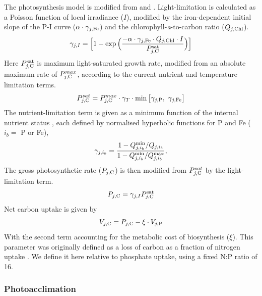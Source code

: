 \documentclass[gmd, manuscript]{copernicus}
\begin{document}
The photosynthesis model is modified from \cite{Geider:1998} and \cite{Moore:2002}. Light-limitation is calculated as a Poisson function of local irradiance ($I$), modified by the iron-dependent initial slope of the P-I curve ($\alpha \cdot \gamma_{j,{\rm Fe}}$) and the chlorophyll-\textit{a}-to-carbon ratio ($Q_{j,{\rm Chl}}$). 
%
\begin{equation}
\label{gammaI}
\gamma_{j,I} = \Big[ 1- \exp \Big( \frac{-\alpha \cdot \gamma_{j,{\rm Fe}} \cdot Q_{j,{\rm Chl}} \cdot { I}}{ P_{j,{\rm C}}^{\rm sat}} \Big) \Big]
\end{equation}
%
Here $P_{j,{\rm C}}^{\rm sat}$ is maximum light-saturated growth rate, modified from an absolute maximum rate of $P_{j,{\rm C}}^{max}$, according to the current nutrient and temperature limitation terms.
%
\begin{equation}
P_{j,{\rm C}}^{sat} = P_{j,{\rm C}}^{max} \cdot \gamma_T \cdot \min \big[ \gamma_{j,{\rm P}},~\gamma_{j,{\rm Fe}} \big]
\end{equation}
%
The nutrient-limitation term is given as a minimum function of the internal nutrient status \citep{Droop:1968,Caperon:1968,Flynn:2008}, each defined by normalised hyperbolic functions for P and Fe ($i_b=$ P or Fe),
%
\begin{equation}
\label{gammaFeP}
\gamma_{j,i_b} = \frac{1 - Q^{\rm min}_{j,i_b} / Q_{j,i_b} } {1 - Q^{\rm min}_{j,i_b} / Q^{\rm max}_{j,i_b} },
\end{equation}
%
The gross photosynthetic rate ($P_{j,{\rm C}}$) is then modified from $P_{j,{\rm C}}^{sat}$ by the light-limitation term.
%
\begin{equation}
P_{j,{\rm C}} = \gamma_{j,I} P_{j,{\rm C}}^{\rm sat}
\end{equation}
%
Net carbon uptake is given by 
%
\begin{equation}
V_{j,{\rm C}} = P_{j,{\rm C}} - \xi \cdot V_{j,{\rm P}}
\end{equation}
%
With the second term accounting for the metabolic cost of biosynthesis ($\xi$). This parameter was originally defined as a loss of carbon as a fraction of nitrogen uptake \citep{Geider:1998}. We define it here relative to phosphate uptake, using a fixed N:P ratio of 16.


\subsubsection{Photoacclimation}
\end{document}
